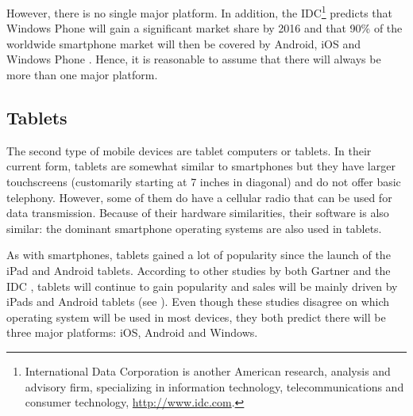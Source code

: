 However, there is no single major platform. In addition, the IDC\footnote{International Data Corporation is another American research, analysis and advisory firm, specializing in information technology, telecommunications and consumer technology, \url{http://www.idc.com}.} predicts that Windows Phone will gain a significant market share by 2016 and that 90\% of the worldwide smartphone market will then be covered by Android, iOS and Windows Phone \cite{IDC:phone}. Hence, it is reasonable to assume that there will always be more than one major platform.

\subsection{Tablets}

The second type of mobile devices are tablet computers or tablets. In their current form, tablets are somewhat similar to smartphones but they have larger touchscreens (customarily starting at 7 inches in diagonal) and do not offer basic telephony. However, some of them do have a cellular radio that can be used for data transmission. Because of their hardware similarities, their software is also similar: the dominant smartphone operating systems are also used in tablets.

As with smartphones, tablets gained a lot of popularity since the launch of the iPad and Android tablets. According to other studies by both Gartner \citep{Gartner:11tab,Gartner:12tab} and the IDC \citep{IDC:tablet}, tablets will continue to gain popularity and sales will be mainly driven by iPads and Android tablets (see ). Even though these studies disagree on which operating system will be used in most devices, they both predict there will be three major platforms: iOS, Android and Windows. 

